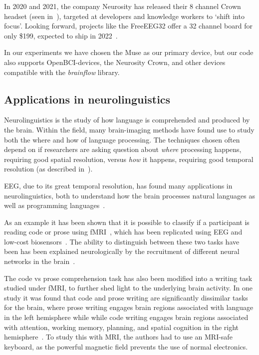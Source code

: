     In 2020 and 2021, the company Neurosity has released their 8 channel Crown headset (seen in~), targeted at developers and knowledge workers to `shift into focus'. Looking forward, projects like the FreeEEG32 offer a 32 channel board for only \$199, expected to ship in 2022~\cite{noauthor_freeeeg32_nodate}.

    In our experiments we have chosen the Muse as our primary device, but our code also supports OpenBCI-devices, the Neurosity Crown, and other devices compatible with the \emph{brainflow} library.

    \subsection*{Applications in neurolinguistics}

        Neurolinguistics is the study of how language is comprehended and produced by the brain. Within the field, many brain-imaging methods have found use to study both the where and how of language processing. The techniques chosen often depend on if researchers are asking question about \emph{where} processing happens, requiring good spatial resolution, versus \emph{how} it happens, requiring good temporal resolution (as described in~).

        EEG, due to its great temporal resolution, has found many applications in neurolinguistics, both to understand how the brain processes natural languages as well as programming languages~\cite{prat_relating_2020}.

        As an example it has been shown that it is possible to classify if a participant is reading code or prose using fMRI~\cite{floyd_decoding_2017}, which has been replicated using EEG and low-cost biosensors~\cite{fucci_replication_2019}. The ability to distinguish between these two tasks have been has been explained neurologically by the recruitment of different neural networks in the brain~\cite{ivanova_comprehension_2020}.

        The code vs prose comprehension task has also been modified into a writing task studied under fMRI, to further shed light to the underlying brain activity. In one study it was found that code and prose writing are significantly dissimilar tasks for the brain, where prose writing engages brain regions associated with language in the left hemisphere while while code writing engages brain regions associated with attention, working memory, planning, and spatial cognition in the right hemisphere~\cite{noauthor_neurological_nodate}. To study this with MRI, the authors had to use an MRI-safe keyboard, as the powerful magnetic field prevents the use of normal electronics.

